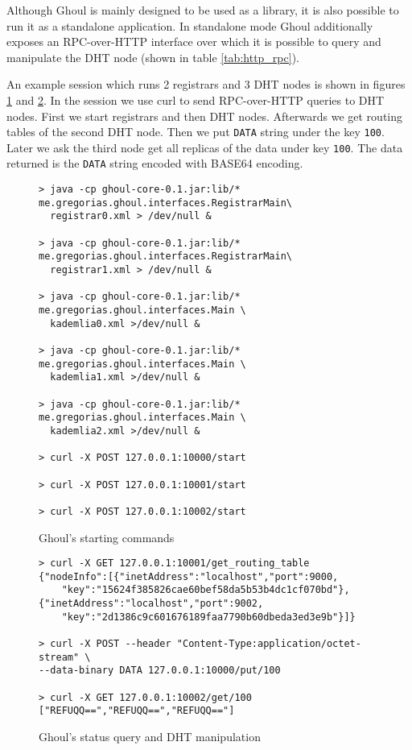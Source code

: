 Although Ghoul is mainly designed to be used as a library, it is also possible to run it as a standalone application.
In standalone mode Ghoul additionally exposes an RPC-over-HTTP interface over which it is possible to query and manipulate the DHT node (shown in table \ref{tab:http_rpc}).

An example session which runs 2 registrars and 3 DHT nodes is shown in figures 
\ref{fig:ghoul_manual_run} and \ref{fig:ghoul_manipulation}.
In the session we use curl to send RPC-over-HTTP queries to DHT nodes.
First we start registrars and then DHT nodes.
Afterwards we get routing tables of the second DHT node.
Then we put \texttt{DATA} string under the key \texttt{100}.
Later we ask the third node get all replicas of the data under key \texttt{100}.
The data returned is the \texttt{DATA} string encoded with BASE64 encoding.

\begin{figure}[tbp]
\begin{verbatim}
> java -cp ghoul-core-0.1.jar:lib/* me.gregorias.ghoul.interfaces.RegistrarMain\
  registrar0.xml > /dev/null &

> java -cp ghoul-core-0.1.jar:lib/* me.gregorias.ghoul.interfaces.RegistrarMain\
  registrar1.xml > /dev/null &

> java -cp ghoul-core-0.1.jar:lib/* me.gregorias.ghoul.interfaces.Main \ 
  kademlia0.xml >/dev/null &

> java -cp ghoul-core-0.1.jar:lib/* me.gregorias.ghoul.interfaces.Main \ 
  kademlia1.xml >/dev/null &

> java -cp ghoul-core-0.1.jar:lib/* me.gregorias.ghoul.interfaces.Main \ 
  kademlia2.xml >/dev/null &

> curl -X POST 127.0.0.1:10000/start

> curl -X POST 127.0.0.1:10001/start

> curl -X POST 127.0.0.1:10002/start
\end{verbatim}
\caption{Ghoul's starting commands}
\label{fig:ghoul_manual_run}
\end{figure}

\begin{figure}[tbp]
\begin{verbatim}
> curl -X GET 127.0.0.1:10001/get_routing_table
{"nodeInfo":[{"inetAddress":"localhost","port":9000,
    "key":"15624f385826cae60bef58da5b53b4dc1cf070bd"},
{"inetAddress":"localhost","port":9002,
    "key":"2d1386c9c601676189faa7790b60dbeda3ed3e9b"}]}

> curl -X POST --header "Content-Type:application/octet-stream" \ 
--data-binary DATA 127.0.0.1:10000/put/100

> curl -X GET 127.0.0.1:10002/get/100
["REFUQQ==","REFUQQ==","REFUQQ=="]
\end{verbatim}
\caption{Ghoul's status query and DHT manipulation}
\label{fig:ghoul_manipulation}
\end{figure}
